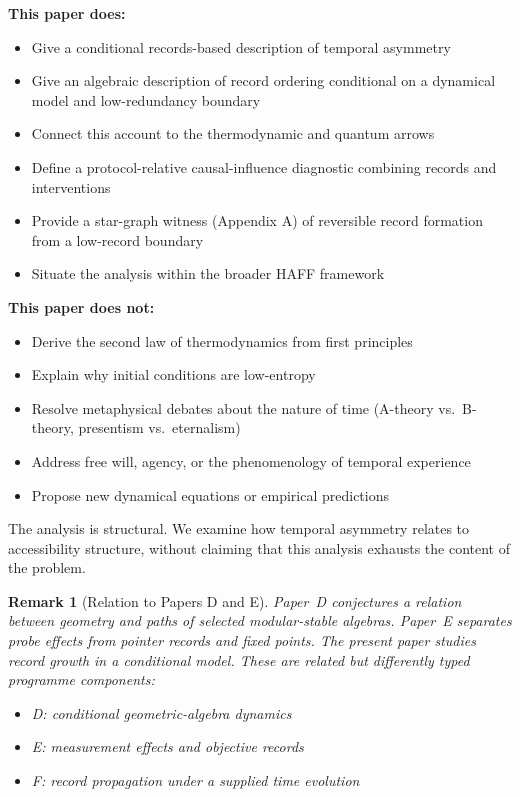 \documentclass[12pt,a4paper]{article}
\newtheorem{remark}[theorem]{Remark}
\begin{document}
\textbf{This paper does:}
\begin{itemize}
    \item Give a conditional records-based description of temporal asymmetry
    \item Give an algebraic description of record ordering conditional on a dynamical model and low-redundancy boundary
    \item Connect this account to the thermodynamic and quantum arrows
    \item Define a protocol-relative causal-influence diagnostic combining records and interventions
    \item Provide a star-graph witness (Appendix A) of reversible record formation from a low-record boundary
    \item Situate the analysis within the broader HAFF framework
\end{itemize}

\textbf{This paper does not:}
\begin{itemize}
    \item Derive the second law of thermodynamics from first principles
    \item Explain why initial conditions are low-entropy
    \item Resolve metaphysical debates about the nature of time (A-theory vs.\ B-theory, presentism vs.\ eternalism)
    \item Address free will, agency, or the phenomenology of temporal experience
    \item Propose new dynamical equations or empirical predictions
\end{itemize}

The analysis is structural. We examine how temporal asymmetry relates to accessibility structure, without claiming that this analysis exhausts the content of the problem.

\begin{remark}[Relation to Papers D and E]
Paper~D \cite{Liu2026PaperD} conjectures a relation between geometry and paths of selected modular-stable algebras. Paper~E \cite{Liu2026PaperE} separates probe effects from pointer records and fixed points. The present paper studies record growth in a conditional model. These are related but differently typed programme components:
\begin{itemize}
    \item D: conditional geometric-algebra dynamics
    \item E: measurement effects and objective records
    \item F: record propagation under a supplied time evolution
\end{itemize}
\end{remark}
\end{document}
